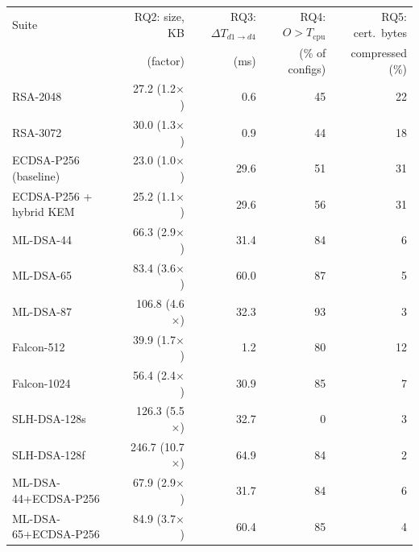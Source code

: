 \begin{tabular}{@{}lrrrr@{}}
\toprule
Suite & RQ2: size, KB & RQ3: $\Delta T_{d1\to d4}$ & RQ4: $O>T_\text{cpu}$ & RQ5: cert.\ bytes \\
 & (factor) & (ms) & (\% of configs) & compressed (\%) \\
\midrule
RSA-2048 & 27.2 (1.2$\times$) & 0.6 & 45 & 22 \\
RSA-3072 & 30.0 (1.3$\times$) & 0.9 & 44 & 18 \\
ECDSA-P256 (baseline) & 23.0 (1.0$\times$) & 29.6 & 51 & 31 \\
ECDSA-P256 + hybrid KEM & 25.2 (1.1$\times$) & 29.6 & 56 & 31 \\
ML-DSA-44 & 66.3 (2.9$\times$) & 31.4 & 84 & 6 \\
ML-DSA-65 & 83.4 (3.6$\times$) & 60.0 & 87 & 5 \\
ML-DSA-87 & 106.8 (4.6$\times$) & 32.3 & 93 & 3 \\
Falcon-512 & 39.9 (1.7$\times$) & 1.2 & 80 & 12 \\
Falcon-1024 & 56.4 (2.4$\times$) & 30.9 & 85 & 7 \\
SLH-DSA-128s & 126.3 (5.5$\times$) & 32.7 & 0 & 3 \\
SLH-DSA-128f & 246.7 (10.7$\times$) & 64.9 & 84 & 2 \\
ML-DSA-44+ECDSA-P256 & 67.9 (2.9$\times$) & 31.7 & 84 & 6 \\
ML-DSA-65+ECDSA-P256 & 84.9 (3.7$\times$) & 60.4 & 85 & 4 \\
\bottomrule
\end{tabular}
